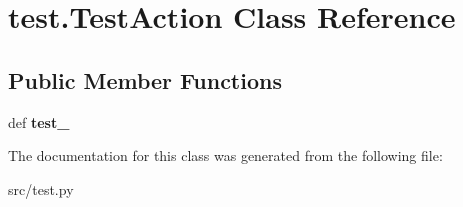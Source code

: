 \hypertarget{classtest_1_1_test_action}{\section{test.\-Test\-Action \-Class \-Reference}
\label{classtest_1_1_test_action}
}
\subsection*{\-Public \-Member \-Functions}
\begin{DoxyCompactItemize}
\item 
\hypertarget{classtest_1_1_test_action_aa865e367d501fed852e019430edfb0c8}{def {\bfseries test\-\_\-}}\label{classtest_1_1_test_action_aa865e367d501fed852e019430edfb0c8}

\end{DoxyCompactItemize}


\-The documentation for this class was generated from the following file\-:\begin{DoxyCompactItemize}
\item 
src/test.\-py\end{DoxyCompactItemize}
